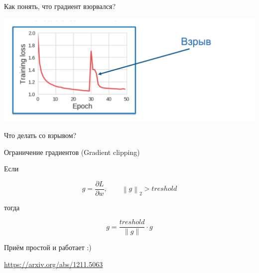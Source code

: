 \documentclass[notes,12pt, aspectratio=169]{beamer}
\newenvironment{wideitemize}{\itemize\addtolength{\itemsep}{10pt}}{\enditemize}
\begin{document}
\begin{frame}{Как понять, что градиент взорвался?}
\begin{center}
	\includegraphics[width=.9\linewidth]{rnn9.png}
\end{center}
Что делать со взрывом? 
\end{frame}


\begin{frame}{Ограничение градиентов (Gradient clipping)}

Если  

\[
g = \frac{\partial L}{\partial w},  \qquad \left\| g \right\|_2 > treshold 
\]

тогда 

\[
g = \frac{treshold}{\|g\|} \cdot g
\]

\alert{Приём простой и работает :)}

\vfill 
\footnotesize 
\color{blue} \url{https://arxiv.org/abs/1211.5063} 
\end{frame}




%
%


%
\end{document}
